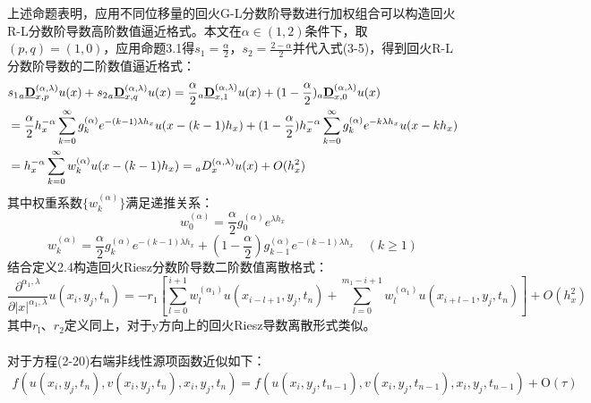 \documentclass[twoside,UTF8]{nputhesis}
\newcommand{\upcite}[1]{\textsuperscript{\textsuperscript{\cite{#1}}}}
\begin{document}
上述命题表明，应用不同位移量的回火G-L分数阶导数进行加权组合可以构造回火R-L分数阶导数高阶数值逼近格式。本文在$\alpha \in (1,2)$条件下，取$(p,q)=(1,0)$，应用命题3.1得${{s}_{1}}=\frac{\alpha }{2}$，${{s}_{2}}=\frac{2-\alpha }{2}$并代入式(3-5)，得到回火R-L分数阶导数的二阶数值逼近格式：
\begin{equation}
\begin{split}
&{{s}_{1}}_{a}\emph{\textbf{D}}_{x,p}^{(\alpha ,\lambda )}u(x)+{{s}_{2}}_{a}\emph{\textbf{D}}_{x,q}^{(\alpha ,\lambda )}u(x)
=\frac{\alpha }{2}{_{a}\emph{\textbf{D}}_{x,1}^{(\alpha ,\lambda )}u(x)}+(1-\frac{\alpha }{2}){_{a}\emph{\textbf{D}}_{x,0}^{(\alpha ,\lambda )}u(x)}  \\
&=\frac{\alpha }{2}{h_{x}^{-\alpha }}\sum\limits_{k=0}^{\infty }{g_{k}^{(\alpha )}}{{e}^{-(k-1)\lambda h_{x}}}u(x-(k-1)h_{x}  )
+(1-\frac{\alpha }{2}){h_{x}^{-\alpha }}\sum\limits_{k=0}^{\infty }{g_{k}^{(\alpha )}}{{e}^{-k\lambda h_{x}}}u(x-kh_{x}  )  \\
&={h_{x}^{-\alpha }}\sum\limits_{k=0}^{\infty }{w_{k}^{(\alpha )}}u(x-(k-1)h_{x}  )
={}_{a}D_{x}^{(\alpha ,\lambda )}u(x)+O({h_{x}^{2}})  \\
\end{split}
\end{equation}
其中权重系数$\{w_{k}^{(\alpha )}\}$满足递推关系：
\[w_{0}^{(\alpha )}=\frac{\alpha }{2}g_{0}^{(\alpha )}{{e}^{\lambda h_{x}}}\]
\[w_{k}^{(\alpha )}=\frac{\alpha }{2}g_{k}^{(\alpha )}{{e}^{-(k-1)\lambda h_{x}}}+(1-\frac{\alpha }{2})g_{k-1}^{(\alpha )}{{e}^{-(k-1)\lambda h_{x}}}\quad(k\ge 1)\]
结合定义2.4构造回火Riesz分数阶导数二阶数值离散格式：
\begin{equation}
\frac{\partial^{\alpha_{1}, \lambda}}{\partial|x|^{\alpha_{1}, \lambda}} u\left(x_{i}, y_{j}, t_{n}\right)=-r_{1}\left[\sum_{l=0}^{i+1} w_{l}^{(\alpha_{1})} u\left(x_{i-l+1}, y_{j}, t_{n}\right)+\sum_{l=0}^{m_{1}-i+1} w_{l}^{(\alpha_{1})
} u\left(x_{i+l-1}, y_{j}, t_{n}\right)\right]+O\left(h_{x}^{2}\right)
\end{equation}
其中$r_{\mathrm{l}}$、$r_{\mathrm{2}}$定义同上，对于y方向上的回火Riesz导数离散形式类似。












对于方程(2-20)右端非线性源项函数近似如下\upcite{liu2013numerical}：
\begin{equation}
\begin{split}
f(u({{x}_{i}},{{y}_{j}},{{t}_{n}}),v({{x}_{i}},{{y}_{j}},{{t}_{n}}),{{x}_{i}},{{y}_{j}},{{t}_{n}})=f(u({{x}_{i}},{{y}_{j}},{{t}_{n-1}}),v({{x}_{i}},{{y}_{j}},{{t}_{n-1}}),{{x}_{i}},{{y}_{j}},{{t}_{n-1}})+{\mathrm O}(\tau )
\end{split}
\end{equation}
\end{document}
